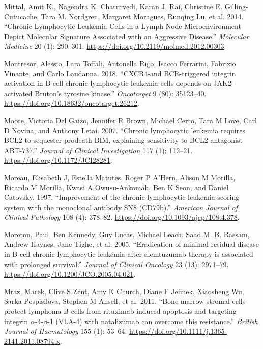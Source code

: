 \documentclass[11pt, a4paper, twosided]{book}
\newenvironment{CSLReferences}%
  {}%
  {\par}
\begin{document}
\begin{CSLReferences}{1}{0}
\leavevmode{}%
Mittal, Amit K., Nagendra K. Chaturvedi, Karan J. Rai, Christine E. Gilling-Cutucache, Tara M. Nordgren, Margaret Moragues, Runqing Lu, et al. 2014. {``{Chronic Lymphocytic Leukemia Cells in a Lymph Node Microenvironment Depict Molecular Signature Associated with an Aggressive Disease}.''} \emph{Molecular Medicine} 20 (1): 290--301. \url{https://doi.org/10.2119/molmed.2012.00303}.

\leavevmode{}%
Montresor, Alessio, Lara Toffali, Antonella Rigo, Isacco Ferrarini, Fabrizio Vinante, and Carlo Laudanna. 2018. {``{CXCR4-and BCR-triggered integrin activation in B-cell chronic lymphocytic leukemia cells depends on JAK2-activated Bruton's tyrosine kinase}.''} \emph{Oncotarget} 9 (80): 35123--40. \url{https://doi.org/10.18632/oncotarget.26212}.

\leavevmode{}%
Moore, Victoria Del Gaizo, Jennifer R Brown, Michael Certo, Tara M Love, Carl D Novina, and Anthony Letai. 2007. {``{Chronic lymphocytic leukemia requires BCL2 to sequester prodeath BIM, explaining sensitivity to BCL2 antagonist ABT-737}.''} \emph{Journal of Clinical Investigation} 117 (1): 112--21. \url{https://doi.org/10.1172/JCI28281}.

\leavevmode{}%
Moreau, Elisabeth J, Estella Matutes, Roger P A'Hern, Alison M Morilla, Ricardo M Morilla, Kwasi A Owusu-Ankomah, Ben K Seon, and Daniel Catovsky. 1997. {``{Improvement of the chronic lymphocytic leukemia scoring system with the monoclonal antibody SN8 (CD79b)}.''} \emph{American Journal of Clinical Pathology} 108 (4): 378--82. \url{https://doi.org/10.1093/ajcp/108.4.378}.

\leavevmode{}%
Moreton, Paul, Ben Kennedy, Guy Lucas, Michael Leach, Saad M. B. Rassam, Andrew Haynes, Jane Tighe, et al. 2005. {``{Eradication of minimal residual disease in B-cell chronic lymphocytic leukemia after alemtuzumab therapy is associated with prolonged survival}.''} \emph{Journal of Clinical Oncology} 23 (13): 2971--79. \url{https://doi.org/10.1200/JCO.2005.04.021}.

\leavevmode{}%
Mraz, Marek, Clive S Zent, Amy K Church, Diane F Jelinek, Xiaosheng Wu, Sarka Pospisilova, Stephen M Ansell, et al. 2011. {``{Bone marrow stromal cells protect lymphoma B-cells from rituximab-induced apoptosis and targeting integrin \(\alpha\)-4-\(\beta\)-1 (VLA-4) with natalizumab can overcome this resistance}.''} \emph{British Journal of Haematology} 155 (1): 53--64. \url{https://doi.org/10.1111/j.1365-2141.2011.08794.x}.


\end{CSLReferences}
\end{document}
